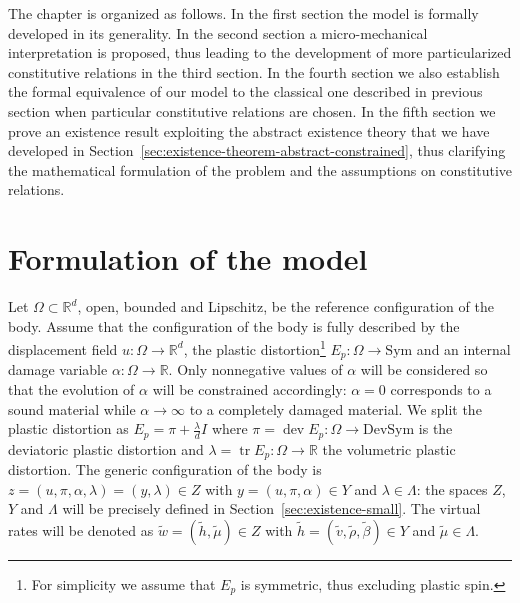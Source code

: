 \documentclass[a4paper,10pt,oneside]{amsbook}
\numberwithin{section}{chapter}
\numberwithin{equation}{chapter}
\theoremstyle{definition}
\DeclareMathOperator{\dev}{dev}
\DeclareMathOperator{\tr}{tr}
\begin{document}
The chapter is organized as follows. In the first section the model is formally developed in its generality. In the second section a micro-mechanical interpretation is proposed, thus leading to the development of more particularized constitutive relations in the third section. In the fourth section we also establish the formal equivalence of our model to the classical one described in previous section when particular constitutive relations are chosen. In the fifth section we prove an existence result exploiting the abstract existence theory that we have developed in Section~\ref{sec:existence-theorem-abstract-constrained}, thus clarifying the mathematical formulation of the problem and the assumptions on constitutive relations.

\section{Formulation of the model}

Let $\Omega\subset\mathbb{R}^d$, open, bounded and Lipschitz, be the reference configuration of the body. Assume that the configuration of the body is fully described by the displacement field $u\colon\Omega\to\mathbb{R}^d$, the plastic distortion\footnote{For simplicity we assume that $E_p$ is symmetric, thus excluding plastic spin.} $E_p\colon\Omega\to\text{Sym}$ and an internal damage variable $\alpha\colon\Omega\to\mathbb{R}$. Only nonnegative values of $\alpha$ will be considered so that the evolution of $\alpha$ will be constrained accordingly: $\alpha=0$ corresponds to a sound material while $\alpha\to\infty$ to a completely damaged material. We split the plastic distortion as $E_p=\pi+\frac{\lambda}{d}I$ where $\pi=\dev E_p\colon\Omega\to\text{DevSym}$ is the deviatoric plastic distortion and $\lambda=\tr E_p\colon\Omega\to\mathbb{R}$ the volumetric plastic distortion. The generic configuration of the body is $z=(u,\pi,\alpha,\lambda)=(y,\lambda)\in Z$ with $y=(u,\pi,\alpha)\in Y$ and $\lambda\in\Lambda$: the spaces $Z$, $Y$ and $\Lambda$ will be precisely defined in Section~\ref{sec:existence-small}. The virtual rates will be denoted as $\tilde w=(\tilde h,\tilde\mu)\in Z$ with $\tilde h=(\tilde v,\tilde\rho,\tilde\beta)\in Y$ and $\tilde\mu\in\Lambda$.
\end{document}
